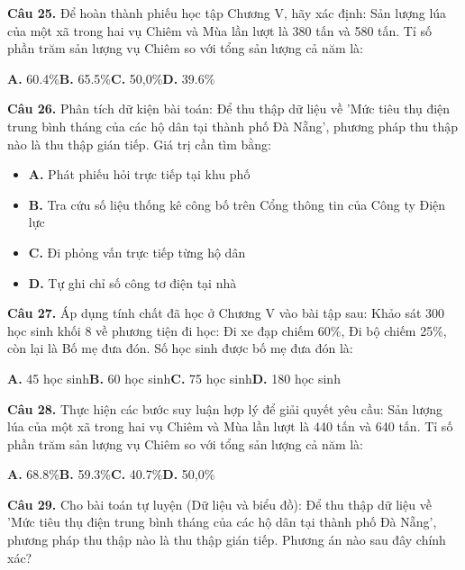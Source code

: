 \documentclass[11pt,a4paper]{article}
\begin{document}
\textbf{\color{primary} Câu 25.} Để hoàn thành phiếu học tập Chương V, hãy xác định: Sản lượng lúa của một xã trong hai vụ Chiêm và Mùa lần lượt là 380 tấn và 580 tấn. Tỉ số phần trăm sản lượng vụ Chiêm so với tổng sản lượng cả năm là:\par
\hspace*{1.5em}\textbf{A.} 60.4\%\quad\quad \textbf{B.} 65.5\%\quad\quad \textbf{C.} 50,0\%\quad\quad \textbf{D.} 39.6\%\par\vspace{2pt}
\textbf{\color{primary} Câu 26.} Phân tích dữ kiện bài toán: Để thu thập dữ liệu về 'Mức tiêu thụ điện trung bình tháng của các hộ dân tại thành phố Đà Nẵng', phương pháp thu thập nào là thu thập gián tiếp. Giá trị cần tìm bằng:\par
\begin{itemize}\setlength{\itemsep}{1pt}\setlength{\parskip}{0pt}
  \item[] \textbf{A.} Phát phiếu hỏi trực tiếp tại khu phố
  \item[] \textbf{B.} Tra cứu số liệu thống kê công bố trên Cổng thông tin của Công ty Điện lực
  \item[] \textbf{C.} Đi phỏng vấn trực tiếp từng hộ dân
  \item[] \textbf{D.} Tự ghi chỉ số công tơ điện tại nhà
\end{itemize}\vspace{2pt}
\textbf{\color{primary} Câu 27.} Áp dụng tính chất đã học ở Chương V vào bài tập sau: Khảo sát 300 học sinh khối 8 về phương tiện đi học: Đi xe đạp chiếm 60\%, Đi bộ chiếm 25\%, còn lại là Bố mẹ đưa đón. Số học sinh được bố mẹ đưa đón là:\par
\hspace*{1.5em}\textbf{A.} 45 học sinh\quad\quad \textbf{B.} 60 học sinh\quad\quad \textbf{C.} 75 học sinh\quad\quad \textbf{D.} 180 học sinh\par\vspace{2pt}
\textbf{\color{primary} Câu 28.} Thực hiện các bước suy luận hợp lý để giải quyết yêu cầu: Sản lượng lúa của một xã trong hai vụ Chiêm và Mùa lần lượt là 440 tấn và 640 tấn. Tỉ số phần trăm sản lượng vụ Chiêm so với tổng sản lượng cả năm là:\par
\hspace*{1.5em}\textbf{A.} 68.8\%\quad\quad \textbf{B.} 59.3\%\quad\quad \textbf{C.} 40.7\%\quad\quad \textbf{D.} 50,0\%\par\vspace{2pt}
\textbf{\color{primary} Câu 29.} Cho bài toán tự luyện (Dữ liệu và biểu đồ): Để thu thập dữ liệu về 'Mức tiêu thụ điện trung bình tháng của các hộ dân tại thành phố Đà Nẵng', phương pháp thu thập nào là thu thập gián tiếp. Phương án nào sau đây chính xác?\par
\end{document}
